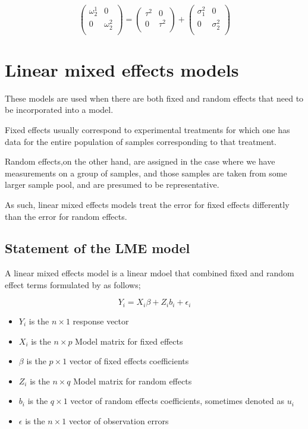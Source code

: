 \documentclass[12pt, a4paper]{report}
\theoremstyle{plain}
\theoremstyle{definition}
\theoremstyle{remark}
\begin{document}
\[\left(\begin{array}{cc}
\omega^1_2  & 0 \\
0 & \omega^2_2 \\
\end{array}  \right)
=  \left(
\begin{array}{cc}
\tau^2  & 0 \\
0 & \tau^2 \\
\end{array} \right)+
\left(
\begin{array}{cc}
\sigma^2_1  & 0 \\
0 & \sigma^2_2 \\
\end{array}\right)
\]

\newpage

	\section{Linear mixed effects models}
	
	These models are used when there are both fixed and random effects that need to be incorporated into a model.
	
	Fixed effects usually correspond to experimental treatments for which one has data for the entire population of samples corresponding to that treatment.
	
	Random effects,on the other hand, are assigned in the case where we have measurements on a group of samples, and those
	samples are taken from some larger sample pool, and are presumed to be representative.
	
	As such, linear mixed effects models treat the error for fixed effects differently than the error for random effects.

\subsection{Statement of the LME model}

A linear mixed effects model is a linear mdoel that combined fixed and random effect terms formulated by \citet{LW82} as follows;

\begin{displaymath}
Y_{i} =X_{i}\beta + Z_{i}b_{i} + \epsilon_{i}
\end{displaymath}
\begin{itemize}
	
	\item $Y_{i}$ is the $n \times 1$ response vector \item $X_{i}$ is
	the $n \times p$ Model matrix for fixed effects \item $\beta$ is
	the $p \times 1$ vector of fixed effects coefficients \item
	$Z_{i}$ is the $n \times q$ Model matrix for random effects \item
	$b_{i}$ is the $q \times 1$ vector of random effects coefficients,
	sometimes denoted as $u_{i}$ \item $\epsilon$ is the $n \times 1$
	vector of observation errors
\end{itemize}
\end{document}
